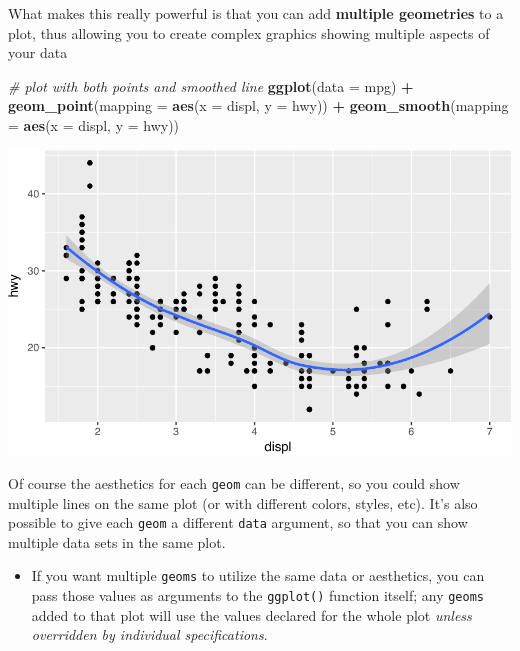 \documentclass[]{book}
\newenvironment{Shaded}{\begin{snugshade}}{\end{snugshade}}
\newcommand{\KeywordTok}[1]{\textcolor[rgb]{0.13,0.29,0.53}{\textbf{#1}}}
\newcommand{\DataTypeTok}[1]{\textcolor[rgb]{0.13,0.29,0.53}{#1}}
\newcommand{\StringTok}[1]{\textcolor[rgb]{0.31,0.60,0.02}{#1}}
\newcommand{\CommentTok}[1]{\textcolor[rgb]{0.56,0.35,0.01}{\textit{#1}}}
\newcommand{\OperatorTok}[1]{\textcolor[rgb]{0.81,0.36,0.00}{\textbf{#1}}}
\newcommand{\NormalTok}[1]{#1}
\providecommand{\tightlist}{%
  \setlength{\itemsep}{0pt}\setlength{\parskip}{0pt}}
\theoremstyle{definition}
\theoremstyle{definition}
\theoremstyle{remark}
\begin{document}
What makes this really powerful is that you can add \textbf{multiple
geometries} to a plot, thus allowing you to create complex graphics
showing multiple aspects of your data

\begin{Shaded}
\begin{Highlighting}[]
\CommentTok{# plot with both points and smoothed line}
\KeywordTok{ggplot}\NormalTok{(}\DataTypeTok{data =}\NormalTok{ mpg) }\OperatorTok{+}
\StringTok{  }\KeywordTok{geom_point}\NormalTok{(}\DataTypeTok{mapping =} \KeywordTok{aes}\NormalTok{(}\DataTypeTok{x =}\NormalTok{ displ, }\DataTypeTok{y =}\NormalTok{ hwy)) }\OperatorTok{+}
\StringTok{  }\KeywordTok{geom_smooth}\NormalTok{(}\DataTypeTok{mapping =} \KeywordTok{aes}\NormalTok{(}\DataTypeTok{x =}\NormalTok{ displ, }\DataTypeTok{y =}\NormalTok{ hwy))}
\end{Highlighting}
\end{Shaded}

\includegraphics{img/ggplot2/multi_geom-1.pdf}

Of course the aesthetics for each \texttt{geom} can be different, so you
could show multiple lines on the same plot (or with different colors,
styles, etc). It's also possible to give each \texttt{geom} a different
\texttt{data} argument, so that you can show multiple data sets in the
same plot.

\begin{itemize}
\tightlist
\item
  If you want multiple \texttt{geoms} to utilize the same data or
  aesthetics, you can pass those values as arguments to the
  \texttt{ggplot()} function itself; any \texttt{geoms} added to that
  plot will use the values declared for the whole plot \emph{unless
  overridden by individual specifications}.
\end{itemize}
\end{document}
